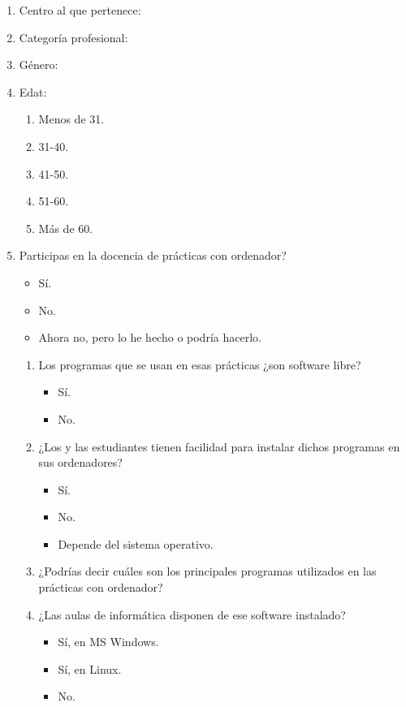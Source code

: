 \documentclass[a4paper,12pt]{article}
\begin{document}
\begin{enumerate}
\item Centro al que pertenece:
\item Categoría profesional:
\item Género:
\item Edat:
   \begin{enumerate}
   \item Menos de 31.
   \item 31-40.
   \item 41-50.
   \item 51-60.
   \item Más de 60.
   \end{enumerate}

\item Participas en la docencia de prácticas con ordenador?
   \begin{itemize}
   \item Sí.
   \item No.
   \item Ahora no, pero lo he hecho o podría hacerlo.
   \end{itemize}

   \begin{enumerate}
   \item Los programas que se usan en esas prácticas ¿son software libre?
      \begin{itemize}
      \item Sí.
      \item No.
      \end{itemize}

   \item ¿Los y las estudiantes tienen facilidad para instalar dichos programas en sus ordenadores?
      \begin{itemize}
      \item Sí.
      \item No.
      \item Depende del sistema operativo.
      \end{itemize}

   \item ¿Podrías decir cuáles son los principales programas utilizados en las prácticas con ordenador?
   \vspace*{1cm}

   \item ¿Las aulas de informática disponen de ese software instalado?
      \begin{itemize}
      \item Sí, en MS Windows.
      \item Sí, en Linux.
      \item No.
      \end{itemize}


\end{enumerate}
\end{enumerate}
\end{document}
